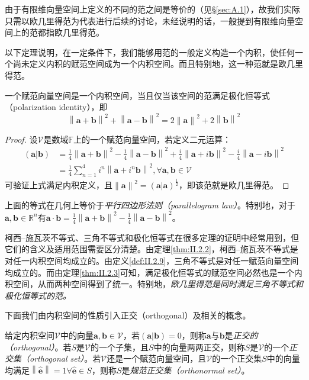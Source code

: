 \documentclass[../main.tex]{subfiles}
\begin{document}
由于有限维向量空间上定义的不同的范之间是等价的（见\S\ref{sec:A.1}），故我们实际只需以欧几里得范为代表进行后续的讨论，未经说明的话，一般提到有限维向量空间上的范都指欧几里得范。

以下定理说明，在一定条件下，我们能够用范的一般定义构造一个内积，使任何一个尚未定义内积的赋范空间成为一个内积空间。而且特别地，这一种范就是欧几里得范。

\begin{theorem}\label{thm:II.2.3}
    一个赋范向量空间是一个内积空间，当且仅当该空间的范满足极化恒等式（polarization identity），即
    \[\left\|\mathbf{a}+\mathbf{b}\right\|^2+\left\|\mathbf{a}-\mathbf{b}\right\|^2=2\left\|\mathbf{a}\right\|^2+2\left\|\mathbf{b}\right\|^2\]
\end{theorem}
\begin{proof}
    设$\mathcal{V}$是数域$\mathbb{F}$上的一个赋范向量空间，若定义二元运算：
    \begin{align*}
        \left(\mathbf{a}|\mathbf{b}\right) & =\frac{1}{4}\left\|\mathbf{a}+\mathbf{b}\right\|^2-\frac{1}{4}\left\|\mathbf{a}-\mathbf{b}\right\|^2+\frac{i}{4}\left\|\mathbf{a}+i\mathbf{b}\right\|^2-\frac{i}{4}\left\|\mathbf{a}-i\mathbf{b}\right\|^2 \\
                                           & =\frac{1}{4}\sum_{n=1}^4i^n\left\|\mathbf{a}+i^n\mathbf{b}\right\|^2,\forall\mathbf{a},\mathbf{b}\in\mathcal{V}
    \end{align*}
    可验证上式满足内积定义，且$\left\|\mathbf{a}\right\|^2=\left(\mathbf{a}|\mathbf{a}\right)^{\frac{1}{2}}$，即该范就是欧几里得范。
\end{proof}

上面的等式在几何上等价于\emph{平行四边形法则（parallelogram law）}。特别地，对于$\mathbf{a},\mathbf{b}\in\mathbb{R}^n$有$\mathbf{a}\cdot\mathbf{b}=\frac{1}{4}\left\|\mathbf{a}+\mathbf{b}\right\|^2-\frac{1}{4}\left\|\mathbf{a}-\mathbf{b}\right\|^2$。

柯西--施瓦茨不等式、三角不等式和极化恒等式在很多定理的证明中经常用到，但它们的含义及适用范围需要区分清楚。由定理\ref{thm:II.2.2}，柯西--施瓦茨不等式是对任一内积空间均成立的。由定义\ref{def:II.2.9}，三角不等式是对任一赋范向量空间均成立的。而由定理\ref{thm:II.2.3}可知，满足极化恒等式的赋范空间必然也是一个内积空间，从而两种空间得到了统一。特别地，\emph{欧几里得范是同时满足三角不等式和极化恒等式的范。}

下面我们由内积空间的性质引入正交（orthogonal）及相关的概念。

\begin{definition}[正交]\label{def:II.2.10}
    给定内积空间$\mathcal{V}$中的向量$\mathbf{a},\mathbf{b}\in\mathcal{V}$，若$\left(\mathbf{a}|\mathbf{b}\right)=0$，则称$\mathbf{a}$与$\mathbf{b}$是\emph{正交的（orthogonal）}。若$S$是$\mathcal{V}$的一个子集，且$S$中的向量两两正交，则称$S$是$\mathcal{V}$的一个\emph{正交集（orthogonal set）}。若$\mathcal{V}$还是一个赋范向量空间，且$\mathcal{V}$的一个正交集$S$中的向量均满足$\left\|\hat{\mathbf{e}}\right\|=1\forall\hat{\mathbf{e}}\in S$，则称$S$是\emph{规范正交集（orthonormal set）}。
\end{definition}
\end{document}
